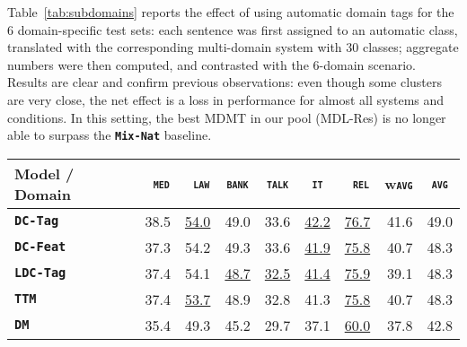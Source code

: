 \documentclass[11pt,a4paper]{article}
\newcommand{\fyTodo}[1]{\Todo[FY:]{\textcolor{orange}{#1}}}
\newcommand{\fyDone}[1]{\done[FY]\Todo[FY:]{\textcolor{orange}{#1}}}
\newcommand{\domain}[1]{\texttt{\textsc{#1}}}
\newcommand{\system}[1]{\texttt{\textbf{#1}}}
\newcommand{\SB}[1]{\textbf{#1}}
\newcommand{\SW}[1]{\underline{#1}}
\begin{document}
Table~\ref{tab:subdomains} reports the effect of using automatic domain tags for the 6 domain-specific test sets: each sentence was first assigned to an automatic class, translated with the corresponding multi-domain system with 30 classes; aggregate numbers were then computed, and contrasted with the 6-domain scenario. Results are clear and confirm previous observations: even though some clusters are very close, the net effect is a loss in performance for almost all systems and conditions. In this setting, the best MDMT in our pool (MDL-Res) is no longer able to surpass the \system{Mix-Nat} baseline.%

\begin{table*}[t]
  \centering
  \fyDone{Fix column size}
  \begin{tabular}{|p{3cm}|*{8}{r|}} \hline
    Model / Domain & \multicolumn{1}{c|}{\domain{ med}} & \multicolumn{1}{c|}{\domain{ law}} & \multicolumn{1}{c|}{\domain{bank}} & \multicolumn{1}{c|}{\domain{talk}} & \multicolumn{1}{c|}{\domain{ it }} & \multicolumn{1}{c|}{\domain{ rel}} & \multicolumn{1}{c|}{w\domain{avg}} & \multicolumn{1}{c|}{\domain{avg}} \\ \hline %
    \system{DC-Tag}       & 38.5 & \SW{54.0} & 49.0   & 33.6 & \SW{42.2} & \SW{76.7} & 41.6 & 49.0 \\%
    \system{DC-Feat}      & 37.3  & 54.2 & 49.3   & 33.6 & \SW{41.9} & \SW{75.8} & 40.7 & 48.3  \\%
    \system{LDC-Tag}     & 37.4   & 54.1 & \SW{48.7} & \SW{32.5} & \SW{41.4} & \SW{75.9} & 39.1 & 48.3         \\%
    \system{TTM}            & 37.4 & \SW{53.7} & 48.9 & 32.8 & 41.3 & \SW{75.8} & 40.7 & 48.3   \\%
    \system{DM}             & 35.4 & 49.3  & 45.2 & 29.7 & 37.1 & \SW{60.0} & 37.8 & 42.8 \\ %

\end{tabular}
\end{table*}
\end{document}
